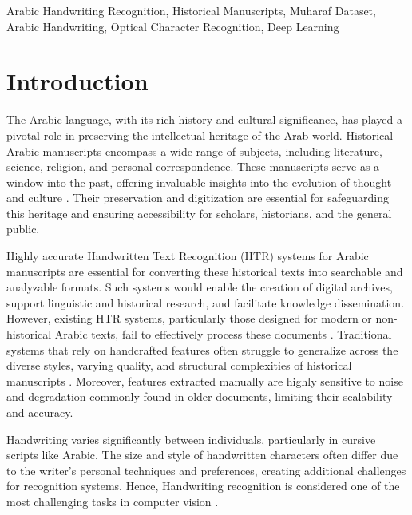 \documentclass[conference]{IEEEtran}
\begin{document}

\begin{IEEEkeywords}
Arabic Handwriting Recognition, Historical Manuscripts, Muharaf Dataset, Arabic Handwriting,  Optical Character Recognition, Deep Learning
\end{IEEEkeywords}

\section{Introduction}

The Arabic language, with its rich history and cultural significance, has played a pivotal role in preserving the intellectual heritage of the Arab world. Historical Arabic manuscripts encompass a wide range of subjects, including literature, science, religion, and personal correspondence. These manuscripts serve as a window into the past, offering invaluable insights into the evolution of thought and culture \cite{ayuba2013}. Their preservation and digitization are essential for safeguarding this heritage and ensuring accessibility for scholars, historians, and the general public.


Highly accurate Handwritten Text Recognition (HTR) systems for Arabic manuscripts are essential for converting these historical texts into searchable and analyzable formats. Such systems would enable the creation of digital archives, support linguistic and historical research, and facilitate knowledge dissemination. However, existing HTR systems, particularly those designed for modern or non-historical Arabic texts, fail to effectively process these documents \cite{alrobah2022arabic}. Traditional systems that rely on handcrafted features often struggle to generalize across the diverse styles, varying quality, and structural complexities of historical manuscripts \cite{parvez2013offline}. Moreover, features extracted manually are highly sensitive to noise and degradation commonly found in older documents, limiting their scalability and accuracy. 

Handwriting varies significantly between individuals, particularly in cursive scripts like Arabic. The size and style of handwritten characters often differ due to the writer's personal techniques and preferences, creating additional challenges for recognition systems. Hence, Handwriting recognition is considered one of the most challenging tasks in computer vision \cite{altwaijry2021arabic}.
\end{document}
